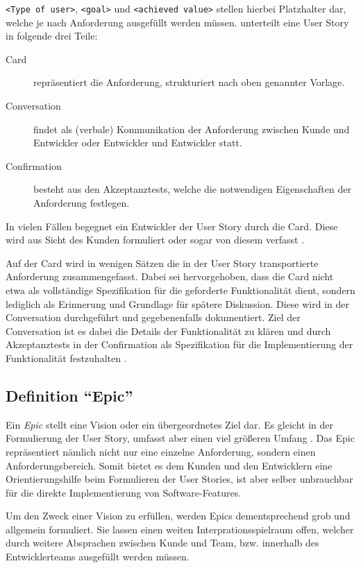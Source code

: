 \documentclass[acmtog]{acmart}
\begin{document}
\verb|<Type of user>|, \verb|<goal>| und \verb|<achieved value>| stellen hierbei Platzhalter dar,
welche je nach Anforderung ausgefüllt werden müssen.
\cite{jeffries_essential_2001} unterteilt eine User Story in folgende drei Teile:
\begin{description}
	\item[Card] repräsentiert die Anforderung, strukturiert nach oben genannter Vorlage.
	\item[Conversation] findet als (verbale) Kommunikation der Anforderung zwischen Kunde und Entwickler oder Entwickler und Entwickler statt.
	\item[Confirmation] besteht aus den Akzeptanztests, welche die notwendigen Eigenschaften der Anforderung festlegen.
\end{description}

In vielen Fällen begegnet ein Entwickler der User Story durch die Card.
Diese wird aus Sicht des Kunden formuliert oder sogar von diesem verfasst \cite[p. 497]{balzert09}.

Auf der Card wird in wenigen Sätzen die in der User Story transportierte Anforderung zusammengefasst.
Dabei sei hervorgehoben, dass die Card nicht etwa als vollständige Spezifikation für die geforderte Funktionalität dient,
sondern lediglich als Erinnerung und Grundlage für spätere Diskussion.
Diese wird in der Conversation durchgeführt und gegebenenfalls dokumentiert.
Ziel der Conversation ist es dabei die Details der Funktionalität zu klären
und durch Akzeptanztests in der Confirmation als Spezifikation für die Implementierung
der Funktionalität festzuhalten \cite[p. 4]{cohn_user_2004}.

\subsection{Definition ``Epic''}
Ein \emph{Epic} stellt eine Vision oder ein übergeordnetes Ziel dar.
Es gleicht in der Formulierung der User Story, umfasst aber einen viel größeren Umfang \cite[pp. 6, 14]{cohn_user_2004}.
Das Epic repräsentiert nämlich nicht nur eine einzelne Anforderung, sondern einen Anforderungsbereich.
Somit bietet es dem Kunden und den Entwicklern eine Orientierungshilfe beim Formulieren der User Stories,
ist aber selber unbrauchbar für die direkte Implementierung von Software-Features.

Um den Zweck einer Vision zu erfüllen, werden Epics dementsprechend grob und allgemein formuliert.
Sie lassen einen weiten Interprationsspielraum offen, welcher durch weitere Absprachen zwischen
Kunde und Team, bzw. innerhalb des Entwicklerteams ausgefüllt werden müssen.
\end{document}

